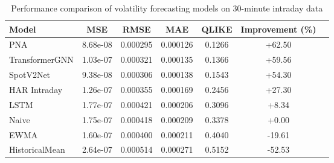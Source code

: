 \documentclass[journal]{IEEEtran}
\begin{document}
\begin{table}[!t]
\centering
\caption{Performance comparison of volatility forecasting models on 30-minute intraday data}
\label{tab:main_results}
\begin{tabular}{@{}lcccccc@{}}
\toprule
Model & MSE & RMSE & MAE & QLIKE & Improvement (\%) \\
\midrule
PNA & 8.68e-08 & 0.000295 & 0.000126 & 0.1266 & +62.50 \\
TransformerGNN & 1.03e-07 & 0.000321 & 0.000135 & 0.1366 & +59.56 \\
SpotV2Net & 9.38e-08 & 0.000306 & 0.000138 & 0.1543 & +54.30 \\
HAR Intraday & 1.26e-07 & 0.000355 & 0.000169 & 0.2456 & +27.30 \\
LSTM & 1.77e-07 & 0.000421 & 0.000206 & 0.3096 & +8.34 \\
\rowcolor{bestcolor}Naive & 1.75e-07 & 0.000418 & 0.000209 & 0.3378 & +0.00 \\
EWMA & 1.60e-07 & 0.000400 & 0.000211 & 0.4040 & -19.61 \\
HistoricalMean & 2.64e-07 & 0.000514 & 0.000271 & 0.5152 & -52.53 \\
\bottomrule
\end{tabular}
\end{table}
\end{document}
